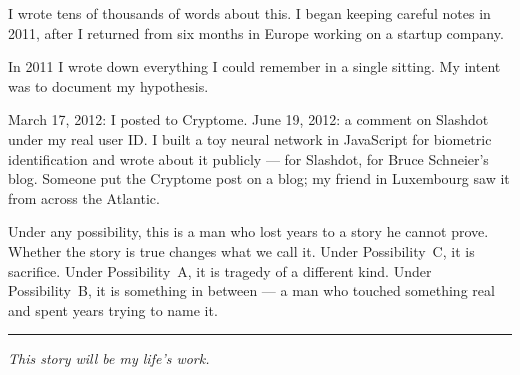 I wrote tens of thousands of words about this. I began keeping careful notes in 2011, after I returned from six months in Europe working on a startup company.

In 2011 I wrote down everything I could remember in a single sitting. My intent was to document my hypothesis.

March 17, 2012: I posted to Cryptome. June 19, 2012: a comment on Slashdot under my real user ID\@. I built a toy neural network in JavaScript for biometric identification and wrote about it publicly --- for Slashdot, for Bruce Schneier's blog. Someone put the Cryptome post on a blog; my friend in Luxembourg saw it from across the Atlantic.

\vspace{0.5cm}

Under any possibility, this is a man who lost years to a story he cannot prove. Whether the story is true changes what we call it. Under Possibility~C, it is sacrifice. Under Possibility~A, it is tragedy of a different kind. Under Possibility~B, it is something in between --- a man who touched something real and spent years trying to name it.

\vspace{1cm}\noindent\rule{0.5\textwidth}{0.5pt}\vspace{0.5cm}

\begin{center}\textit{This story will be my life's work.}\end{center}

\chapterreturn
